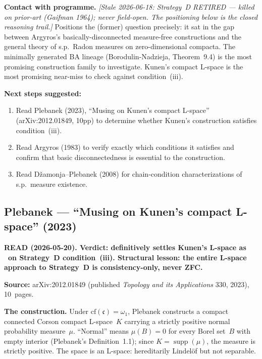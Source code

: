 \medskip\noindent
\textbf{Contact with programme.}  \emph{[Stale 2026-06-18: Strategy~D RETIRED ---
killed on prior-art (Gaifman 1964); never field-open. The positioning below is the
closed reasoning trail.]}  Positions the (former) question precisely: it sat
in the gap between Argyros's
basically-disconnected measure-free constructions and the general
theory of s.p.\ Radon measures on zero-dimensional compacta.  The
minimally generated BA lineage (Borodulin-Nadzieja, Theorem~9.4) is
the most promising construction family to investigate.  Kunen's
compact L-space is the most promising near-miss to check against
condition~(iii).

\medskip\noindent
\textbf{Next steps suggested:}
\begin{enumerate}[nosep]
  \item Read Plebanek (2023), ``Musing on Kunen's compact L-space''
    (arXiv:2012.01849, 10pp) to determine whether Kunen's construction
    satisfies condition~(iii).
  \item Read Argyros (1983) to verify exactly which conditions it
    satisfies and confirm that basic disconnectedness is essential to
    the construction.
  \item Read D\v{z}amonja--Plebanek (2008) for chain-condition
    characterizations of s.p.\ measure existence.
\end{enumerate}

\subsection*{Plebanek --- ``Musing on Kunen's compact L-space''
(2023)}

\textbf{READ (2026-05-20).  Verdict: definitively settles Kunen's
L-space as \texttimes\ on Strategy~D condition~(iii).  Structural
lesson: the entire L-space approach to Strategy~D is
consistency-only, never ZFC.}

\medskip\noindent
\textbf{Source:} arXiv:2012.01849 (published \emph{Topology and its
Applications} 330, 2023), 10~pages.

\medskip\noindent
\textbf{The construction.}  Under $\mathrm{cf}(\mathfrak{c}) =
\omega_1$, Plebanek constructs a compact connected Corson compact
L-space~$K$ carrying a strictly positive normal probability
measure~$\mu$.  ``Normal'' means $\mu(B) = 0$ for every Borel
set~$B$ with empty interior (Plebanek's Definition~1.1); since
$K = \operatorname{supp}(\mu)$, the measure is strictly positive.
The space is an L-space: hereditarily Lindel\"{o}f but not separable.

